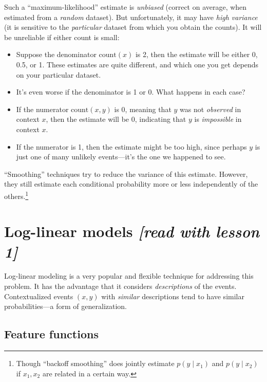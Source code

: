 \documentclass[11pt]{article}
\newcommand{\ph}{\hat{p}}
\begin{document}
Such a ``maximum-likelihood'' estimate is {\em unbiased} (correct on
average, when estimated from a {\em random} dataset).  But unfortunately, it
may have {\em high variance} (it is sensitive to the {\em particular}
dataset from which you obtain the counts).  It will be unreliable if
either count is small:
\begin{itemize}[noitemsep]
\item Suppose the denominator $\textrm{count}(x)$ is 2, then the estimate
  will be either 0, 0.5, or 1.  These estimates are quite different,
  and which one you get depends on your particular dataset.  
\item It's even worse if the denominator is 1 or 0.  What happens in
  each case?
\item If the numerator $\textrm{count}(x,y)$ is 0, meaning that $y$
  was not {\em observed} in context $x$, then the estimate will
  be 0, indicating that $y$ is {\em impossible} in context $x$.  
\item If the numerator is 1, then the estimate might be too high,
  since perhaps $y$ is just one of many unlikely events---it's the one
  we happened to see.
\end{itemize}

\noindent
``Smoothing'' techniques try to reduce the variance of this estimate.
However, they still estimate each conditional probability more or less
independently of the others.\footnote{Though ``backoff smoothing'' does jointly
  estimate $p(y \mid x_1)$ and $p(y \mid x_2)$ if $x_1, x_2$ are
  related in a certain way.}

\section{Log-linear models {\em [read with lesson 1]}}

Log-linear modeling is a very popular and flexible technique for
addressing this problem.  It has the advantage that it considers {\em
  descriptions} of the events.  Contextualized events $(x,y)$ with
{\em similar} descriptions tend to have similar probabilities---a form
of generalization.

\subsection{Feature functions}\label{sec:featfuncs}
\end{document}
